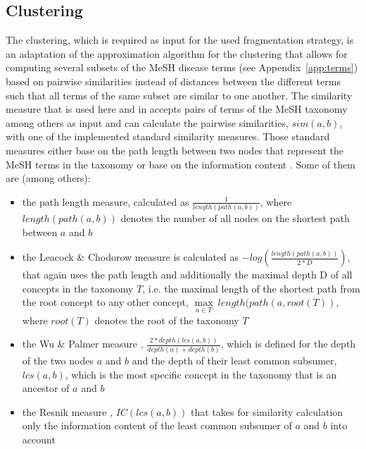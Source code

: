\subsection{Clustering}
\label{sec:impl_clust}

The clustering, which is required as input for the used fragmentation strategy, is an adaptation of the approximation algorithm 
\citep{Gonzales1985} for the clustering that allows for computing several subsets of the MeSH disease terms (see Appendix~\ref{app:terms}) based on pairwise 
similarities instead of distances between the different terms such that all terms of the same subset are similar to one another. The similarity measure 
\citep{McInnes2009} that is used here and in \citet{Wiese2014} accepts pairs of terms of the MeSH taxonomy among others as input and can calculate the
pairwise similarities, $sim(a,b)$, with one of the implemented standard similarity measures. Those standard measures either base on the path length between
two nodes that represent the MeSH terms in the taxonomy or base on the information content \citep{Resnik1995}. Some of them are (among others):
\begin{itemize}
    \item the path length measure, calculated as $\frac{1}{length(path(a,b))}$, where $length(path(a,b))$ denotes the number of all nodes on the shortest path 
        between $a$ and $b$
    \item the Leacock \& Chodorow measure \citep{Leacock1998} is calculated as $-log(\frac{length(path(a,b))}{2*D})$, that again uses the path length and
        additionally the maximal depth D of all concepts in the taxonomy $T$, i.e. the maximal length of the shortest path from the root concept to any other
        concept, $\max\limits_{a \in T}~length(path(a, root(T))$, where $root(T)$ denotes the root of the taxonomy $T$
    \item the Wu \& Palmer measure \citep{Wu1994}, $\frac{2*depth(lcs(a,b))}{depth(a)+depth(b)}$, which is defined for the depth of the two nodes $a$ and 
        $b$ and the depth of their least common subsumer, $lcs(a,b)$, which is the most specific concept in the taxonomy that is an ancestor of $a$ and $b$
    \item the Resnik measure \citep{Resnik1995}, $IC(lcs(a,b))$ that takes for similarity calculation only the information content of the least common 
        subsumer of $ a$ and $b$ into account
\end{itemize}


